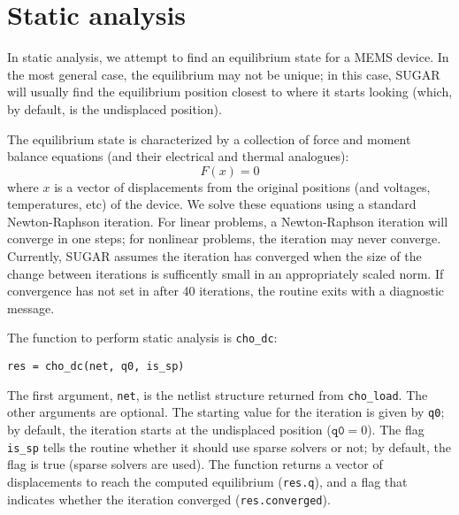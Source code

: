 %


\section{Static analysis}

In static analysis, we attempt to find an equilibrium state for a MEMS
device.  In the most general case, the equilibrium may not be unique;
in this case, SUGAR will usually find the equilibrium position closest
to where it starts looking (which, by default, is the undisplaced position).

The equilibrium state is characterized by a collection of force and moment
balance equations (and their electrical and thermal analogues):
\[
  F(x) = 0
\]
where $x$ is a vector of displacements from the original positions
(and voltages, temperatures, etc) of the device.
We solve these equations using a standard Newton-Raphson
iteration.  For linear problems, a Newton-Raphson iteration will converge
in one steps; for nonlinear problems, the iteration may never converge.
Currently, SUGAR assumes the iteration has converged when the size of the
change between iterations is sufficently small in an appropriately scaled
norm.  If convergence has not set in after 40 iterations, the routine
exits with a diagnostic message.

The function to perform static analysis is \texttt{cho\_dc}:
\begin{center}
\begin{verbatim}
res = cho_dc(net, q0, is_sp)
\end{verbatim}
\end{center}
The first argument, \texttt{net}, is the netlist structure
returned from \texttt{cho\_load}.  The other arguments are optional.
The starting value for the iteration is given by \texttt{q0};
by default, the iteration starts at the undisplaced position 
($\mathtt{q0} = 0$).  The flag \texttt{is\_sp} tells the routine
whether it should use sparse solvers or not; by default, the flag is
true (sparse solvers are used).  The function returns a vector
of displacements to reach the computed equilibrium (\texttt{res.q}),
and a flag that indicates whether the iteration converged 
(\texttt{res.converged}).

